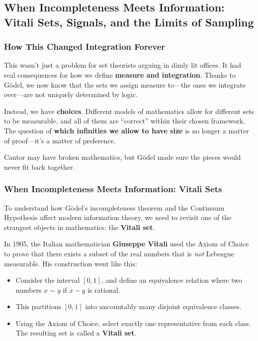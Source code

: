 \subsection{When Incompleteness Meets Information: Vitali Sets, Signals, and the Limits of Sampling}

\subsubsection{How This Changed Integration Forever}

This wasn’t just a problem for set theorists arguing in dimly lit offices. It had real consequences for how we define \textbf{measure and integration}. Thanks to Gödel, we now know that the sets we assign measure to—the ones we integrate over—are not uniquely determined by logic.

Instead, we have \textbf{choices}. Different models of mathematics allow for different sets to be measurable, and all of them are “correct” within their chosen framework. The question of \textbf{which infinities we allow to have size} is no longer a matter of proof—it’s a matter of preference.

Cantor may have broken mathematics, but Gödel made sure the pieces would never fit back together. 

\subsubsection{When Incompleteness Meets Information: Vitali Sets}

To understand how Gödel’s incompleteness theorem and the Continuum Hypothesis affect modern information theory, we need to revisit one of the strangest objects in mathematics: the \textbf{Vitali set}.

In 1905, the Italian mathematician \textbf{Giuseppe Vitali} used the Axiom of Choice to prove that there exists a subset of the real numbers that is \emph{not} Lebesgue measurable. His construction went like this:

\begin{itemize}
  \item Consider the interval \([0,1]\), and define an equivalence relation where two numbers \( x \sim y \) if \( x - y \) is rational.
  \item This partitions \([0,1]\) into uncountably many disjoint equivalence classes.
  \item Using the Axiom of Choice, select exactly one representative from each class. The resulting set is called a \textbf{Vitali set}.
\end{itemize}


